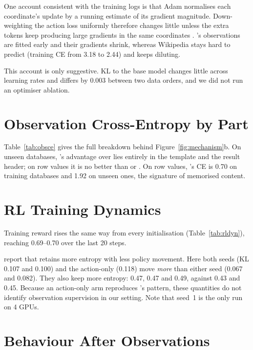 One account consistent with the training logs is that Adam normalises each coordinate's update by a running estimate of its gradient magnitude. Down-weighting the action loss uniformly therefore changes little unless the extra tokens keep producing large gradients in the same coordinates \citep{elich2023mtl}. \armB's observations are fitted early and their gradients shrink, whereas Wikipedia stays hard to predict (training CE from 3.18 to 2.44) and keeps diluting.

This account is only suggestive. KL to the base model changes little across learning rates and differs by 0.003 between two data orders, and we did not run an optimiser ablation.

\section{Observation Cross-Entropy by Part}
\label{app:obsce}

Table~\ref{tab:obsce} gives the full breakdown behind Figure~\ref{fig:mechanism}b. On unseen databases, \armB's advantage over \armA{} lies entirely in the template and the result header; on row values it is no better than \armA{} or \armD{}. On row values, \armB's CE is 0.70 on training databases and 1.92 on unseen ones, the signature of memorised content.



\section{RL Training Dynamics}
\label{app:rldyn}

Training reward rises the same way from every initialisation (Table~\ref{tab:rldyn}), reaching 0.69--0.70 over the last 20 steps.

\citet{zhang2026actobs} report that \armB{} retains more entropy with less policy movement. Here both \armB{} seeds (KL 0.107 and 0.100) and the action-only \armC{} (0.118) move \emph{more} than either \armA{} seed (0.067 and 0.082). They also keep more entropy: 0.47, 0.47 and 0.49, against 0.43 and 0.45. Because an action-only arm reproduces \armB's pattern, these quantities do not identify observation supervision in our setting. Note that \armA{} seed~1 is the only run on 4 GPUs.



\section{Behaviour After Observations}
\label{app:behaviour}

